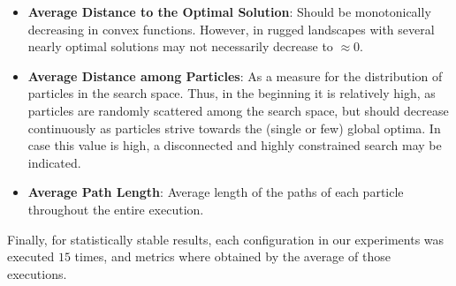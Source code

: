 \documentclass[12pt]{article}
\begin{document}
\begin{itemize}
	
	\item \textbf{Average Distance to the Optimal Solution}: Should be monotonically decreasing in convex functions. However, in rugged landscapes with several nearly optimal solutions may not necessarily decrease to $\approx 0$.
	\item \textbf{Average Distance among Particles}: As a measure for the distribution of particles in the search space. 
	Thus, in the beginning it is relatively high, as particles are randomly scattered among the search space, but should decrease continuously as particles strive towards the (single or few) global optima. 
	In case this value is high, a disconnected and highly constrained search may be indicated. 
	\item \textbf{Average Path Length}: Average length of the paths of each particle throughout the entire execution.
		
\end{itemize}

Finally, for statistically stable results, each configuration in our experiments was executed $15$ times, and metrics where obtained by the average of those executions.
%
%
%
\FloatBarrier
\end{document}
